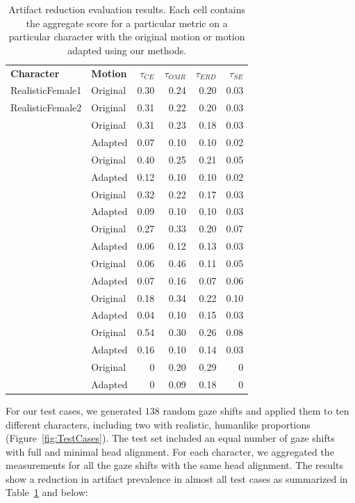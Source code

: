 \begin{table}
\small
\centering
\def\arraystretch{1.5}
\begin{tabular}{llrrrr}
\hline
\textbf{Character} & \textbf{Motion} & $\tau_{CE}$ & $\tau_{OMR}$ & $\tau_{ERD}$ & $\tau_{SE}$ \\
\Xhline{2\arrayrulewidth}
RealisticFemale1 & Original & 0.30 & 0.24 & 0.20 & 0.03 \\
\hdashline
RealisticFemale2 & Original & 0.31 & 0.22 & 0.20 & 0.03 \\
\hdashline
\multirow{2}{*}{SemiStylizedFemale} & Original & 0.31 & 0.23 & 0.18 & 0.03 \\
& Adapted & 0.07 & 0.10 & 0.10 & 0.02 \\
\hdashline
\multirow{2}{*}{StylizedFemale} & Original & 0.40 & 0.25 & 0.21 & 0.05 \\
& Adapted & 0.12 & 0.10 & 0.10 & 0.02 \\
\hdashline
\multirow{2}{*}{StylizedMale} & Original & 0.32 & 0.22 & 0.17 & 0.03 \\
& Adapted & 0.09 & 0.10 & 0.10 & 0.03 \\
\hdashline
\multirow{2}{*}{EmotiGuy} & Original & 0.27 & 0.33 & 0.20 & 0.07 \\
& Adapted & 0.06 & 0.12 & 0.13 & 0.03 \\
\hdashline
\multirow{2}{*}{Jack} & Original & 0.06 & 0.46 & 0.11 & 0.05 \\
& Adapted & 0.07 & 0.16 & 0.07 & 0.06 \\
\hdashline
\multirow{2}{*}{Donkey} & Original & 0.18 & 0.34 & 0.22 & 0.10 \\
& Adapted & 0.04 & 0.10 & 0.15 & 0.03 \\
\hdashline
\multirow{2}{*}{Fish} & Original & 0.54 & 0.30 & 0.26 & 0.08 \\
& Adapted & 0.16 & 0.10 & 0.14 & 0.03 \\
\hdashline
\multirow{2}{*}{NastyMonster} & Original & 0 & 0.20 & 0.29 & 0 \\
& Adapted & 0 & 0.09 & 0.18 & 0 \\
\hline
\end{tabular}
\caption{Artifact reduction evaluation results. Each cell contains the aggregate score for a particular metric on a particular character with the original motion or motion adapted using our methods.}
\label{tab:EvalResults}
\end{table}

For our test cases, we generated $138$ random gaze shifts and applied them to ten different characters, including two with realistic, humanlike proportions (Figure~\ref{fig:TestCases}). The test set included an equal number of gaze shifts with full and minimal head alignment. For each character, we aggregated the measurements for all the gaze shifts with the same head alignment. The results show a reduction in artifact prevalence in almost all test cases as summarized in Table~\ref{tab:EvalResults} and below:

